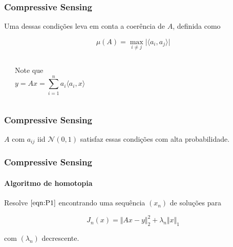 \documentclass[11pt]{beamer}
\begin{document}
\begin{frame}
\frametitle{Compressive Sensing}
Uma dessas condições leva em conta a coerência de $A$, definida como

$$\mu(A) = \max_{i \neq j} \vert \langle a_i, a_j \rangle \vert$$

\begin{center}
\begin{columns}[t]
\vspace{.5cm}
\begin{center}
\end{center}
\begin{center}
Note que
$$y = Ax = \sum_{i = 1}^n a_i \langle a_i, x \rangle$$
\end{center}
\end{columns}
\end{center}

\end{frame}

\begin{frame}
\frametitle{Compressive Sensing}
$A$ com $a_{ij}$ iid $\mathcal{N}(0,1)$ satisfaz essas condições com alta probabilidade.
\end{frame}

\begin{frame}
\frametitle{Compressive Sensing}
\framesubtitle{Algoritmo de homotopia}
Resolve $\eqref{eqn:P1}$ encontrando uma sequência $(x_n)$ de soluções para

$$J_n(x) = \Vert Ax - y \Vert_2^2 + \lambda_n \Vert x \Vert_1$$

com $(\lambda_n)$ decrescente.
\end{frame}
\end{document}
